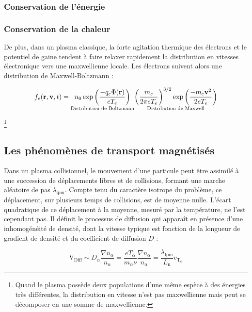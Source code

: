 \begin{refsection}
\subsubsection{Conservation de l'énergie}
\subsubsection{Conservation de la chaleur}

De plus, dans un plasma classique,
la forte agitation thermique des électrons et le potentiel de gaine tendent à
faire relaxer rapidement la distribution en vitesses électronique vers une
maxwellienne locale. Les électrons suivent alors une distribution de Maxwell-Boltzmann :

\begin{equation}
	f_e(\mathbf{r},\mathbf{v},t)=\underset{\text{Distribution de Boltzmann}}
	{n{_{0}}\exp\left(\frac{-q_e\Phi(\mathbf r)}{eT_e}\right)}
	\underset{\text{Distribution de Maxwell}} {\left(\frac{m_e}{2\pi
	eT_e}\right)^{{3/2}}\exp\left(\frac{-m_e
	\mathbf v^{{2}}}{2eT_e}\right)}
\end{equation}
 
 
 \footnote{Quand le
plasma possède deux populations d'une même espèce à des énergies très différentes, la
distribution en vitesse n'est pas maxwellienne mais peut se décomposer en une somme de maxwellienne.}

\subsection{Les phénomènes de transport magnétisés}
Dans un plasma collisionnel, le mouvement d'une particule peut être assimilé à
une succession de déplacements libres et de collisions, formant une marche
aléatoire de pas $\lambda_\text{lpm}$. Compte tenu du caractère isotrope du
problème, ce déplacement, sur plusieurs temps de collisions, est de
moyenne nulle. L'écart quadratique de ce déplacement à la moyenne, mesuré par la
température, ne l'est cependant pas. Il définit le processus de diffusion qui
apparaît en présence d'une inhomogénéité de densité, dont la vitesse typique est
fonction de la longueur de gradient de densité et du coefficient de diffusion
$D$ :
 
\begin{equation}
    \text{V}_\text{Diff}\sim D_\alpha\frac{\nabla
    n_\alpha}{n_\alpha}=\frac{eT_\alpha}{m_\alpha\nu}\frac{\nabla
    n_\alpha}{n_\alpha}=\frac{\lambda_\text{lpm}}{L_\text{n}}v_{\text{T}_\alpha}
\end{equation}
 

\end{refsection}
